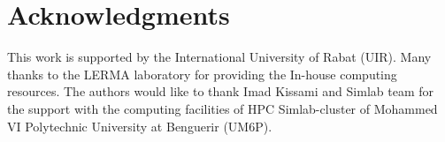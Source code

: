 \documentclass[conf]{new-aiaa}
\begin{document}
\section*{Acknowledgments}
This work is supported by the International University of Rabat (UIR). Many thanks to the LERMA laboratory for providing the In-house computing resources.
%
The authors would like to thank Imad Kissami and Simlab team for the support with the computing facilities of HPC Simlab-cluster of Mohammed VI Polytechnic University at Benguerir (UM6P).


\end{document}
